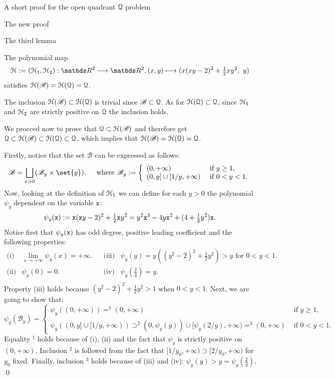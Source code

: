 \documentclass[11pt, a4paper, english, twoside, notitlepage, openright]{report}
\begin{document}
\begin{chapter}{A short proof for the open quadrant $\mathcal{Q}$ problem}
\begin{section}{The new proof}
\begin{subsection}{The third lemma}
\begin{lemma}\label{lemma3}
The polynomial map 
$$
\HH := (\HH_1, \HH_2): \R^2 \longrightarrow \R^2, (x, y) \longmapsto (x(xy - 2)^2 + \tfrac{1}{2} xy^2,\ y)
$$
satisfies $\mathcal{H}(\mathscr{B}) = \mathcal{H}(\mathcal{Q}) = \mathcal{Q}$.
\begin{Proof}
The inclusion $\mathcal{H}(\mathscr{B}) \subset \mathcal{H}(\mathcal{Q})$ is trivial since $\mathscr{B} \subset \mathcal{Q}$. As for $\mathcal{H}(\mathcal{Q}) \subset \mathcal{Q}$, since $\mathcal{H}_1$ and $\mathcal{H}_2$ are strictly positive on $\mathcal{Q}$ the inclusion holds.

We procced now to prove that $\mathcal{Q} \subset \mathcal{H}(\mathscr{B})$ and therefore get $\mathcal{Q} \subset \mathcal{H}(\mathscr{B}) \subset \mathcal{H}(\mathcal{Q}) \subset \mathcal{Q}$, which implies that $\mathcal{H}(\mathscr{B}) = \mathcal{H}(\mathcal{Q}) = \mathcal{Q}$.

Firstly, notice that the set $\mathscr{B}$ can be expressed as follows:
$$
\mathscr{B} = \bigsqcup_{x>0}(\mathscr{B}_y \times \set{y}), \quad \text{ where } \mathscr{B}_y := 
\left\{
\begin{array}{ll}
(0, +\infty) & \text{ if } y \ge 1,\\
(0, y] \cup [1/y, +\infty) & \text { if } 0 < y < 1.
\end{array}
\right.
$$
Now, looking at the definition of $\mathcal{H}_1$ we can define for each $y > 0$ the polynomial $\psi_y$ dependent on the variable ${\tt x}$:
$$
\psi_y({\tt x}) := {\tt x}({\tt x}y - 2)^2 + \tfrac{1}{2}{\tt x}y^2 = y^2{\tt x}^3 - 4y{\tt x}^2 + (4 + \tfrac{1}{2}y^2){\tt x}.
$$
Notice first that $\psi_y({\tt x})$ has odd degree, positive leading coefficient and the following properties:
$$
\begin{array}{llcll}
\text{(i)}& \lim_{x\rightarrow+\infty}\psi_y(x) = +\infty. & &
\text{(iii)}& \psi_y(y) = y((y^2 - 2)^2 + \tfrac{1}{2}y^2) > y \text{ for } 0 < y < 1.\\
\text{(ii)}& \psi_y(0) = 0. & &
\text{(iv)}& \psi_y\left(\tfrac{2}{y}\right) = y.\\
\end{array}
$$
Property (iii) holds because $(y^2 - 2)^2 + \tfrac{1}{2}y^2 > 1$ when $0 < y < 1$. Next, we are going to show that:
$$
\psi_y(\mathscr{B}_y) = 
\left\{
\begin{array}{ll}
\psi_y((0, +\infty)) =^1 (0, +\infty) & \text{ if } y \ge 1,\\
\psi_y((0, y] \cup [1/y, +\infty)) \supset^2 (0, \psi_y(y)) \cup [\psi_y(2/y), +\infty) =^3 (0, +\infty) & \text { if } 0 < y < 1.
\end{array}
\right.
$$
Equality $^1$ holds because of (i), (ii) and the fact that $\psi_y$ is strictly positive on $(0, +\infty)$. Inclusion $^2$ is followed from the fact that $[1/y_0, +\infty) \supset [2/y_0, +\infty)$ for $y_0$ fixed. Finally, inclusion $^3$ holds because of (iii) and (iv): $\psi_y(y) > y = \psi_y\left(\tfrac{2}{y}\right)$.
\qed
\end{Proof}
\end{lemma}
\end{subsection}




\end{section}
\end{chapter}
\end{document}
